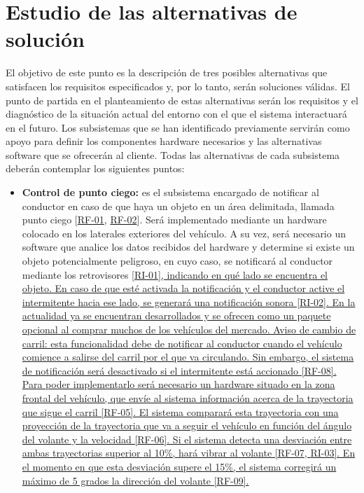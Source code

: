 \section{Estudio de las alternativas de solución}
El objetivo de este punto es la descripción de tres posibles alternativas que satisfacen los requisitos especificados y, por lo tanto, serán soluciones válidas. El punto de partida en el planteamiento de estas alternativas serán los requisitos y el diagnóstico de la situación actual del entorno con el que el sistema interactuará en el futuro. Los subsistemas que se han identificado previamente servirán como apoyo para definir los componentes hardware necesarios y las alternativas software que se ofrecerán al cliente. Todas las alternativas de cada subsistema deberán contemplar los siguientes puntos:

\begin{itemize}[-]
\item \textbf{Control de punto ciego:} es el subsistema encargado de notificar al conductor en caso de que haya un objeto en un área delimitada, llamada punto ciego [\hyperref[tab:RF-01]{RF-01}, \hyperref[tab:RF-02]{RF-02}]. Será implementado mediante un hardware colocado en los laterales exteriores del vehículo. A su vez, será necesario un software que analice los datos recibidos del hardware y determine si existe un objeto potencialmente peligroso, en cuyo caso, se notificará al conductor mediante los retrovisores [\hyperref[tab:RI-01]{RI-01], indicando en qué lado se encuentra el objeto. En caso de que esté activada la notificación y el conductor active el intermitente hacia ese lado, se generará una notificación sonora [\hyperref[tab:RI-02]{RI-02}]. En la actualidad ya se encuentran desarrollados y se ofrecen como un paquete opcional al comprar muchos de los vehículos del mercado.
Aviso de cambio de carril: esta funcionalidad debe de notificar al conductor cuando el vehículo comience a salirse del carril por el que va circulando. Sin embargo, el sistema de notificación será desactivado si el intermitente está accionado [\hyperref[tab:RF-08]{RF-08}]. Para poder implementarlo será necesario un hardware situado en la zona frontal del vehículo, que envíe al sistema información acerca de la trayectoria que sigue el carril [\hyperref[tab:RF-05]{RF-05].  El sistema comparará esta trayectoria con una proyección de la trayectoria que va a seguir el vehículo en función del ángulo del volante y la velocidad [\hyperref[tab:RF-06]{RF-06}]. Si el sistema detecta una desviación entre ambas trayectorias superior al 10\%, hará vibrar al volante [\hyperref[tab:RF-07]{RF-07}, \hyperref[tab:RI-03]{RI-03}]. En el momento en que esta desviación supere el 15\%, el sistema corregirá un máximo de 5 grados la dirección del volante [\hyperref[tab:RF-09]{RF-09}].
}}
\end{itemize}
